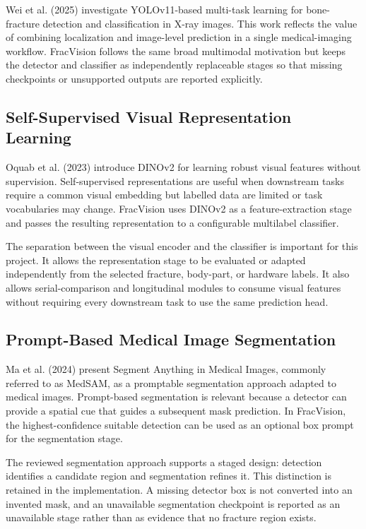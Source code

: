 \documentclass[12pt,a4paper]{article}
\begin{document}
Wei et al. (2025) investigate YOLOv11-based multi-task learning for bone-fracture detection and classification in X-ray images. This work reflects the value of combining localization and image-level prediction in a single medical-imaging workflow. FracVision follows the same broad multimodal motivation but keeps the detector and classifier as independently replaceable stages so that missing checkpoints or unsupported outputs are reported explicitly.

\subsection{Self-Supervised Visual Representation Learning}
Oquab et al. (2023) introduce DINOv2 for learning robust visual features without supervision. Self-supervised representations are useful when downstream tasks require a common visual embedding but labelled data are limited or task vocabularies may change. FracVision uses DINOv2 as a feature-extraction stage and passes the resulting representation to a configurable multilabel classifier.

The separation between the visual encoder and the classifier is important for this project. It allows the representation stage to be evaluated or adapted independently from the selected fracture, body-part, or hardware labels. It also allows serial-comparison and longitudinal modules to consume visual features without requiring every downstream task to use the same prediction head.

\subsection{Prompt-Based Medical Image Segmentation}
Ma et al. (2024) present Segment Anything in Medical Images, commonly referred to as MedSAM, as a promptable segmentation approach adapted to medical images. Prompt-based segmentation is relevant because a detector can provide a spatial cue that guides a subsequent mask prediction. In FracVision, the highest-confidence suitable detection can be used as an optional box prompt for the segmentation stage.

The reviewed segmentation approach supports a staged design: detection identifies a candidate region and segmentation refines it. This distinction is retained in the implementation. A missing detector box is not converted into an invented mask, and an unavailable segmentation checkpoint is reported as an unavailable stage rather than as evidence that no fracture region exists.
\end{document}
